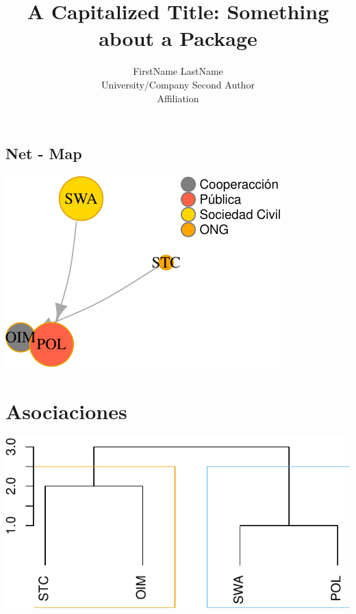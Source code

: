 \documentclass[
]{jss}
\author{
FirstName LastName\\University/Company \And Second Author\\Affiliation
}
\title{A Capitalized Title: Something about a Package \pkg{foo}}
\begin{document}
\hypertarget{net---map}{%
\subsection{Net - Map}\label{net---map}}

\begin{CodeChunk}


\begin{center}\includegraphics{netmap_oim_files/figure-latex/unnamed-chunk-2-1} \end{center}

\end{CodeChunk}

\hypertarget{asociaciones}{%
\section{Asociaciones}\label{asociaciones}}

\begin{CodeChunk}


\begin{center}\includegraphics{netmap_oim_files/figure-latex/unnamed-chunk-3-1} \end{center}

\end{CodeChunk}
\end{document}
